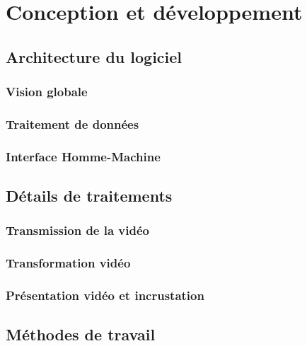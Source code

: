 \chapter{Conception et développement}

	\section{Architecture du logiciel}

		\subsection{Vision globale}
			
			\lipsum[2-3]

		\subsection{Traitement de données}

			\lipsum[2-3]
			
		\subsection{Interface Homme-Machine}
		
			\lipsum[4-6]

	\section{Détails de traitements}
	
		\subsection{Transmission de la vidéo}
		
			\lipsum[2-3]
			
		\subsection{Transformation vidéo}
		
			\lipsum[6-9]
			
		\subsection{Présentation vidéo et incrustation}
		
			\lipsum[10-12]
			
	\section{Méthodes de travail}

